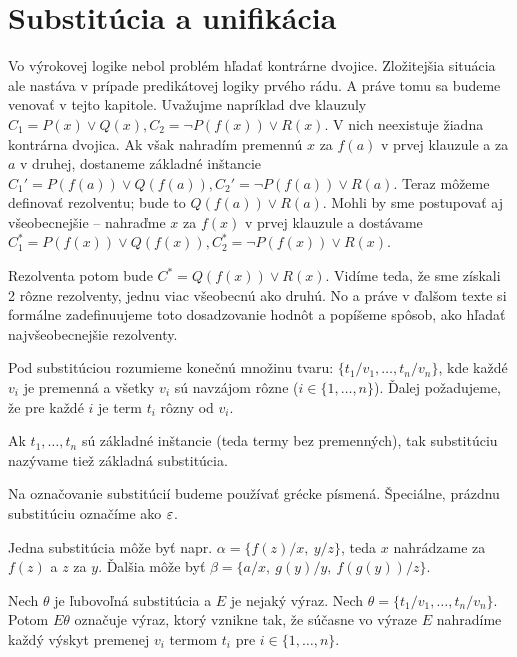 \section{Substitúcia a unifikácia}

Vo výrokovej logike nebol problém hľadať kontrárne dvojice.
Zložitejšia situácia ale nastáva v prípade predikátovej logiky
prvého rádu. A práve tomu sa budeme venovať v tejto kapitole.
Uvažujme napríklad dve klauzuly
$C_1=P(x) \lor Q(x), C_2 = \neg P(f(x)) \lor R(x)$.
V nich neexistuje žiadna kontrárna dvojica. Ak však nahradím premennú
$x$ za $f(a)$ v prvej klauzule a za $a$ v druhej,
dostaneme základné inštancie
$C_1'=P(f(a)) \lor Q(f(a)), C_2'=\neg P(f(a)) \lor R(a)$.
Teraz môžeme definovať rezolventu; bude to $Q(f(a)) \lor R(a)$.
Mohli by sme postupovať aj všeobecnejšie -- nahraďme $x$ za $f(x)$ v
prvej klauzule a dostávame
$ C_1^*= P(f(x)) \lor Q(f(x)), C_2^*= \neg P(f(x)) \lor R(x)$.

Rezolventa potom bude $C^*= Q(f(x)) \lor R(x)$.
Vidíme teda, že sme získali 2 rôzne rezolventy, jednu viac všeobecnú
ako druhú. No a práve v ďalšom texte si formálne zadefinuujeme toto
dosadzovanie hodnôt a popíšeme spôsob, ako hľadať najvšeobecnejšie
rezolventy.

\begin{definicia}[Substitúcia]
    Pod substitúciou rozumieme konečnú množinu tvaru:
    $\{t_1/v_1, \ldots, t_n/v_n\}$, kde každé $v_i$ je premenná a všetky
    $v_i$ sú navzájom rôzne ($i \in\{1,\dots,n\}$).
    Ďalej požadujeme, že pre každé $i$ je term  $t_i$ rôzny od $v_i$.

    Ak $t_1, \ldots, t_n$ sú základné inštancie (teda termy bez premenných),
    tak substitúciu nazývame tiež základná substitúcia.
\end{definicia}

\begin{poznamka}
    Na označovanie substitúcií budeme používať grécke písmená.
    Špeciálne, prázdnu substitúciu označíme ako $\varepsilon$.
\end{poznamka}

\begin{priklad}
    Jedna substitúcia môže byť napr.
    $\alpha = \{ f(z)/x,\ y/z\}$, teda $x$ nahrádzame za $f(z)$ a
    $z$ za $y$.
    Ďalšia môže byť $\beta = \{ a/x,\ g(y)/y,\ f(g(y))/z\}$.
\end{priklad}

\begin{definicia}
    Nech $\theta$ je ľubovoľná substitúcia a $E$ je nejaký výraz.
    Nech $\theta = \{ t_1/v_1, \dots, t_n/v_n\}$.
    Potom $E\theta$ označuje výraz, ktorý vznikne tak,
    že súčasne vo výraze $E$ nahradíme každý výskyt premenej $v_i$ termom $t_i$
    pre $i \in \{1,\dots,n\}$.
\end{definicia}

